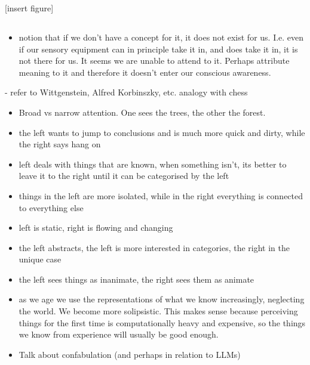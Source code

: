 [insert figure]




















\subsection{}
\begin{itemize}
    \item notion that if we don't have a concept for it, it does not exist for us. I.e. even if our sensory equipment can in principle take it in, and does take it in, it is not there for us. It seems we are unable to attend to it. Perhaps attribute meaning to it and therefore it doesn't enter our conscious awareness.
\end{itemize}

- refer to Wittgenstein, Alfred Korbinszky, etc. analogy with chess

\begin{itemize}
    \item Broad vs narrow attention. One sees the trees, the other the forest.
    \item the left wants to jump to conclusions and is much more quick and dirty, while the right says hang on
    \item left deals with things that are known, when something isn't, its better to leave it to the right until it can be categorised by the left
    \item things in the left are more isolated, while in the right everything is connected to everything else
    \item left is static, right is flowing and changing
    \item the left abstracts, the left is more interested in categories, the right in the unique case
    \item the left sees things as inanimate, the right sees them as animate
    \item as we age we use the representations of what we know increasingly, neglecting the world. We become more solipsistic. This makes sense because perceiving things for the first time is computationally heavy and expensive, so the things we know from experience will usually be good enough.
    \item Talk about confabulation (and perhaps in relation to LLMs)
\end{itemize}

